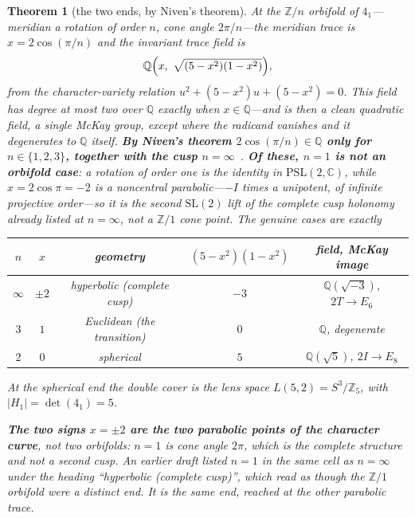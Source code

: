 \documentclass[11pt,reqno]{amsart}
\theoremstyle{plain}
\newtheorem{theorem}{Theorem}[section]
\theoremstyle{definition}
\theoremstyle{remark}
\newcommand{\Q}{\mathbb{Q}}
\newcommand{\Z}{\mathbb{Z}}
\newcommand{\C}{\mathbb{C}}
\newcommand{\SL}{\mathrm{SL}}
\begin{document}
\begin{theorem}[the two ends, by Niven's theorem]\label{thm:ends}
At the $\Z/n$ orbifold of $4_1$---meridian a rotation of order $n$, cone angle
$2\pi/n$---the meridian trace is $x=2\cos(\pi/n)$ and the invariant trace field is
\[
   \Q\Bigl(x,\ \sqrt{(5-x^2)(1-x^2)}\Bigr),
\]
from the character-variety relation $u^2+(5-x^2)u+(5-x^2)=0$. This field has degree \emph{at most} two over $\Q$
exactly when $x\in\Q$---and is then a \emph{clean} quadratic field, a single McKay group,
except where the radicand vanishes and it degenerates to $\Q$ itself. \textbf{By Niven's
theorem $2\cos(\pi/n)\in\Q$ only for $n\in\{1,2,3\}$, together with the cusp
$n=\infty$}~\cite{Niven}. \textbf{Of these, $n=1$ is not an orbifold case}: a rotation of
order one is the identity in $\mathrm{PSL}(2,\C)$, while $x=2\cos\pi=-2$ is a \emph{noncentral}
parabolic---$-I$ times a unipotent, of infinite projective order---so it is the second
$\SL(2)$ lift of the complete cusp holonomy already listed at $n=\infty$, not a $\Z/1$
cone point. The genuine cases are exactly
\begin{center}\small
\begin{tabular}{@{}ccccc@{}}
\toprule
$n$ & $x$ & geometry & $(5-x^2)(1-x^2)$ & field, McKay image\\
\midrule
$\infty$ & $\pm2$ & hyperbolic (complete cusp) & $-3$ & $\Q(\sqrt{-3})$, $2T\to E_6$\\
$3$ & $1$ & Euclidean (the transition) & $0$ & $\Q$, degenerate\\
$2$ & $0$ & spherical & $5$ & $\Q(\sqrt5)$, $2I\to E_8$\\
\bottomrule
\end{tabular}
\end{center}
At the spherical end the double cover is the lens space $L(5,2)=S^3/\Z_5$, with
$|H_1|=\det(4_1)=5$.

\textbf{The two signs $x=\pm2$ are the two parabolic points of the character curve}, not
two orbifolds: $n=1$ is cone angle $2\pi$, which is the complete structure and not a
second cusp. An earlier draft listed $n=1$ in the same cell as $n=\infty$ under the
heading ``hyperbolic (complete cusp)'', which read as though the $\Z/1$ orbifold were a
distinct end. It is the same end, reached at the other parabolic trace.
\end{theorem}
\end{document}

